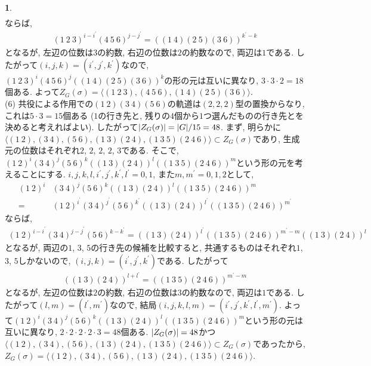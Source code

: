\documentclass{amsart}
\theoremstyle{definition}
\newtheorem{ans}{}
\numberwithin{ans}{subsection}
\DeclarePairedDelimiter{\abs}{\lvert}{\rvert}
\begin{document}
\begin{ans}
\begin{align*}
  \end{align*}
  ならば,
  \begin{align*}
    (1\ 2\ 3)^{i-i^\prime}(4\ 5\ 6)^{j-j^\prime} = ((1\ 4)(2\ 5)(3\ 6))^{k^\prime - k}
  \end{align*}
  となるが, 左辺の位数は$3$の約数, 右辺の位数は$2$の約数なので, 両辺は$1$である.
  したがって$(i, j, k) = (i^\prime, j^\prime, k^\prime)$なので,
  $(1\ 2\ 3)^i(4\ 5\ 6)^j((1\ 4)(2\ 5)(3\ 6))^k$の形の元は互いに異なり, $3 \cdot 3 \cdot 2 = 18$個ある.
  よって$Z_G(\sigma) = \langle (1\ 2\ 3), (4\ 5\ 6), (1\ 4)(2\ 5)(3\ 6) \rangle$.\\
  (6) 共役による作用での$(1\ 2)(3\ 4)(5\ 6)$の軌道は$(2, 2, 2)$型の置換からなり, これは$5 \cdot 3 = 15$個ある ($1$の行き先と, 残りの$4$個から$1$つ選んだものの行き先とを決めると考えればよい).
  したがって$\abs{Z_G(\sigma)} = \abs{G}/15 = 48$.
  まず, 明らかに$\langle (1\ 2), (3\ 4), (5\ 6), (1\ 3)(2\ 4), (1\ 3\ 5)(2\ 4\ 6) \rangle \subset Z_G(\sigma)$であり,
  生成元の位数はそれぞれ$2$, $2$, $2$, $2$, $3$である.
  そこで, $(1\ 2)^i(3\ 4)^j(5\ 6)^k((1\ 3)(2\ 4))^l((1\ 3\ 5)(2\ 4\ 6))^m$という形の元を考えることにする.
  $i, j, k, l, i^\prime, j^\prime, k^\prime, l^\prime = 0, 1$, また$m, m^\prime = 0, 1, 2$として,
  \begin{align*}
    (1\ 2)^i&(3\ 4)^j(5\ 6)^k((1\ 3)(2\ 4))^l((1\ 3\ 5)(2\ 4\ 6))^m\\
    = &(1\ 2)^{i^\prime}(3\ 4)^{j^\prime}(5\ 6)^{k^\prime}((1\ 3)(2\ 4))^{l^\prime}((1\ 3\ 5)(2\ 4\ 6))^{m^\prime}
  \end{align*}
  ならば,
  \begin{align*}
    (1\ 2)^{i - i^\prime}(3\ 4)^{j - j^\prime}(5\ 6)^{k - k^\prime}
     = ((1\ 3)(2\ 4))^{l^\prime}((1\ 3\ 5)(2\ 4\ 6))^{m^\prime - m}((1\ 3)(2\ 4))^l
  \end{align*}
  となるが, 両辺の$1$, $3$, $5$の行き先の候補を比較すると, 共通するものはそれぞれ$1$, $3$, $5$しかないので,
  $(i, j, k) = (i^\prime, j^\prime, k^\prime)$である. したがって
  \begin{align*}
    ((1\ 3)(2\ 4))^{l + l^\prime} = ((1\ 3\ 5)(2\ 4\ 6))^{m^\prime - m}
  \end{align*}
  となるが, 左辺の位数は$2$の約数, 右辺の位数は$3$の約数なので, 両辺は$1$である.
  したがって$(l, m) = (l^\prime, m^\prime)$なので, 結局$(i, j, k, l, m) = (i^\prime, j^\prime, k^\prime, l^\prime, m^\prime)$.
  よって$(1\ 2)^i(3\ 4)^j(5\ 6)^k((1\ 3)(2\ 4))^l((1\ 3\ 5)(2\ 4\ 6))^m$という形の元は互いに異なり,
  $2 \cdot 2 \cdot 2 \cdot 2 \cdot 3 = 48$個ある.
  $\abs{Z_G(\sigma)} = 48$かつ
  $\langle (1\ 2), (3\ 4), (5\ 6), (1\ 3)(2\ 4), (1\ 3\ 5)(2\ 4\ 6) \rangle \subset Z_G(\sigma)$であったから,
  $Z_G(\sigma) = \langle (1\ 2), (3\ 4), (5\ 6), (1\ 3)(2\ 4), (1\ 3\ 5)(2\ 4\ 6) \rangle$.
\end{ans}
\end{document}
